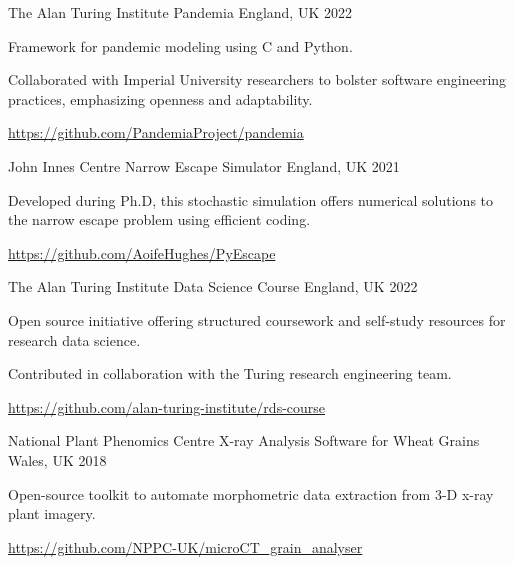 \begin{cventries}
  \cventry
    {The Alan Turing Institute} %
    {Pandemia} %
    {England, UK} %
    {2022} %
    {
      \begin{cvitems}
        \item {Framework for pandemic modeling using C and Python.}
        \item {Collaborated with Imperial University researchers to bolster software engineering practices, emphasizing openness and adaptability.}
        \item {\url{https://github.com/PandemiaProject/pandemia}}
      \end{cvitems}
    }

  \cventry
    {John Innes Centre} %
    {Narrow Escape Simulator} %
    {England, UK} %
    {2021} %
    {
      \begin{cvitems}
        \item {Developed during Ph.D, this stochastic simulation offers numerical solutions to the narrow escape problem using efficient coding.}
        \item {\url{https://github.com/AoifeHughes/PyEscape}}
      \end{cvitems}
    }

  \cventry
    {The Alan Turing Institute} %
    {Data Science Course} %
    {England, UK} %
    {2022} %
    {
      \begin{cvitems}
        \item {Open source initiative offering structured coursework and self-study resources for research data science.}
        \item {Contributed in collaboration with the Turing research engineering team.}
        \item {\url{https://github.com/alan-turing-institute/rds-course}}
      \end{cvitems}
    }

  \cventry
    {National Plant Phenomics Centre} %
    {X-ray Analysis Software for Wheat Grains} %
    {Wales, UK} %
    {2018} %
    {
      \begin{cvitems}
        \item {Open-source toolkit to automate morphometric data extraction from 3-D x-ray plant imagery.}
        \item {\url{https://github.com/NPPC-UK/microCT_grain_analyser}}
      \end{cvitems}
    }

\end{cventries}
